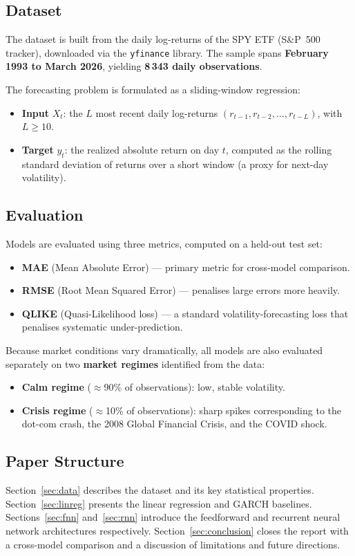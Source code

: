 \subsection{Dataset}

The dataset is built from the daily log-returns of the SPY ETF (S\&P~500 tracker),
downloaded via the \texttt{yfinance} library. The sample spans \textbf{February 1993 to
March 2026}, yielding \textbf{8\,343 daily observations}.

The forecasting problem is formulated as a sliding-window regression:
\begin{itemize}
  \item \textbf{Input} $X_t$: the $L$ most recent daily log-returns
        $(r_{t-1}, r_{t-2}, \ldots, r_{t-L})$, with $L \geq 10$.
  \item \textbf{Target} $y_t$: the realized absolute return on day $t$, computed as the
        rolling standard deviation of returns over a short window (a proxy for
        next-day volatility).
\end{itemize}

\subsection{Evaluation}

Models are evaluated using three metrics, computed on a held-out test set:

\begin{itemize}
  \item \textbf{MAE} (Mean Absolute Error) --- primary metric for cross-model comparison.
  \item \textbf{RMSE} (Root Mean Squared Error) --- penalises large errors more heavily.
  \item \textbf{QLIKE} (Quasi-Likelihood loss) --- a standard volatility-forecasting loss
        that penalises systematic under-prediction.
\end{itemize}

Because market conditions vary dramatically, all models are also evaluated separately on
two \textbf{market regimes} identified from the data:
\begin{itemize}
  \item \textbf{Calm regime} ($\approx$90\% of observations): low, stable volatility.
  \item \textbf{Crisis regime} ($\approx$10\% of observations): sharp spikes corresponding
        to the dot-com crash, the 2008 Global Financial Crisis, and the COVID shock.
\end{itemize}

\subsection{Paper Structure}

Section~\ref{sec:data} describes the dataset and its key statistical properties.
Section~\ref{sec:linreg} presents the linear regression and GARCH baselines.
Sections~\ref{sec:fnn} and~\ref{sec:rnn} introduce the feedforward and recurrent
neural network architectures respectively.
Section~\ref{sec:conclusion} closes the report with a cross-model comparison and
a discussion of limitations and future directions.
